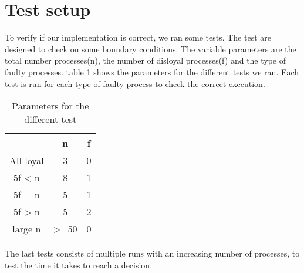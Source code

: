 \section{Test setup}

To verify if our implementation is correct, we ran some tests.
The test are designed to check on some boundary conditions.
The variable parameters are the total number processes(n), the number of disloyal processes(f) and the type of faulty processes.
table \ref{table:Tests} shows the parameters for the different tests we ran. Each test is run for each type of faulty process to check the correct execution.

\begin{table}[h]
	\begin{tabular}{ | c | c  | c  | }
		\hline
  		& n & f \\
		\hline
 		All loyal &  3 & 0  \\
		\hline
  		5f < n  & 8 & 1  \\
		\hline
		5f = n & 5 & 1 \\
		\hline
		5f > n & 5 & 2 \\
		\hline
		large n  & >=50 & 0 \\
		\hline
	\end{tabular}
	\caption{Parameters for the different test}	
	\label{table:Tests}
\end{table}

The last tests consists of multiple runs with an increasing number of processes, to test the time it takes to reach a decision.